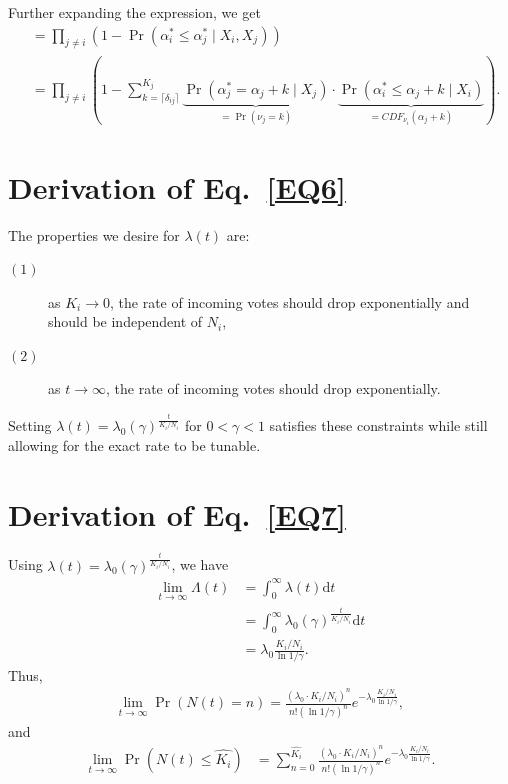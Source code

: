 \documentclass[format=acmsmall, review=true, screen=true, anonymous=true]{acmart}
\begin{document}
Further expanding the expression, we get
\begin{align*}
&= \prod_{j \neq i} \left( 1 - \Pr(\alpha^*_i \leq \alpha^*_j \mid X_i, X_j) \right)\\
&= \prod_{j \neq i} \left( 1 - \sum_{k=\lceil\delta_{ij}\rceil}^{K_j} \underbrace{\Pr(\alpha^*_j = \alpha_j + k \mid X_j)}_{= \Pr(\nu_j = k)} \cdot \underbrace{\Pr(\alpha^*_i \leq \alpha_j + k \mid X_i)}_{={CDF}_{\nu_i}(\alpha_j + k)} \right).
\end{align*}

\section{Derivation of Eq.~\eqref{EQ6}}
The properties we desire for $\lambda(t)$ are:
\begin{description}
\item[$(1)$] as $K_i \rightarrow 0$, the rate of incoming votes should drop exponentially and should be independent of $N_i$,
\item[$(2)$] as $t \rightarrow \infty$, the rate of incoming votes should drop exponentially.
\end{description}
Setting $\lambda (t) = \lambda_0 {(\gamma)}^{\frac{t}{K_i/N_i}}$ for $0 < \gamma < 1$ satisfies these constraints while still allowing for the exact rate to be tunable.

\section{Derivation of Eq.~\eqref{EQ7}}
Using $\lambda (t) = \lambda_0 {(\gamma)}^{\frac{t}{K_i/N_i}}$, we have
\begin{align*}
\lim_{t \rightarrow \infty} \Lambda (t) &=\int _{0}^{\infty}\lambda (t)\mathrm{d}t\\
&= \int _{0}^{\infty} \lambda_0 {(\gamma)}^{\frac{t}{K_i/N_i}} \mathrm{d}t\\
&= \lambda_0 \frac{K_i/N_i}{\ln{1/\gamma}}.
\end{align*}
Thus,
\begin{align*}
\lim_{t\rightarrow \infty}\Pr\left(N(t) = n\right) = \frac{(\lambda_0 \cdot K_i/N_i)^n}{n!(\ln{1/\gamma})^n}e^{-\lambda_0 \frac{K_i/N_i}{\ln{1/\gamma}}},
\end{align*}
and
\begin{align*}
\lim_{t\rightarrow \infty}\Pr\left(N(t)\leq \hat{K_i}\right) & = \sum_{n=0}^{\hat{K_i}} \frac{(\lambda_0 \cdot K_i/N_i)^n}{n!(\ln{1/\gamma})^n}e^{-\lambda_0 \frac{K_i/N_i}{\ln{1/\gamma}}}.
\end{align*}




\end{document}
